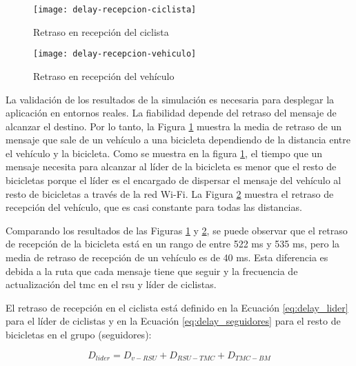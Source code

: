 \begin{figure}[t]
	\texttt{[image: delay-recepcion-ciclista]}
	\caption{Retraso en recepción del ciclista}
	\label{fig:delay-recepcion-ciclista}
\end{figure}

\begin{figure}[t]
	\texttt{[image: delay-recepcion-vehiculo]}
	\caption{Retraso en recepción del vehículo}
	\label{fig:delay-recepcion-vehiculo}
\end{figure}

La validación de los resultados de la simulación es necesaria para desplegar la
aplicación en entornos reales. La fiabilidad depende del retraso del mensaje de
alcanzar el destino. Por lo tanto, la Figura \ref{fig:delay-recepcion-ciclista}
muestra la media de retraso de un mensaje que sale de un vehículo a una
bicicleta dependiendo de la distancia entre el vehículo y la bicicleta. Como
se muestra en la figura \ref{fig:delay-recepcion-ciclista}, el tiempo que un
mensaje necesita para alcanzar al líder de la bicicleta es menor que el resto
de bicicletas porque el líder es el encargado de dispersar el mensaje del
vehículo al resto de bicicletas a través de la red Wi-Fi. La Figura
\ref{fig:delay-recepcion-vehiculo} muestra el retraso de recepción del vehículo,
que es casi constante para todas las distancias.

Comparando los resultados de las Figuras \ref{fig:delay-recepcion-ciclista} y
\ref{fig:delay-recepcion-vehiculo}, se puede observar que el retraso de
recepción de la bicicleta está en un rango de entre 522 ms y 535 ms, pero la
media de retraso de recepción de un vehículo es de 40 ms. Esta diferencia es
debida a la ruta que cada mensaje tiene que seguir y la frecuencia de
actualización del \gls{tmc} en el \gls{rsu} y líder de ciclistas.

El retraso de recepción en el ciclista está definido en la Ecuación
\ref{eq:delay_lider} para el líder de ciclistas y en la Ecuación
\ref{eq:delay_seguidores} para el resto de bicicletas en el grupo (seguidores):

\begin{equation}\label{eq:delay_lider}
D_{lider} = D_{v-RSU} + D_{RSU-TMC} + D_{TMC-BM}
\end{equation}

